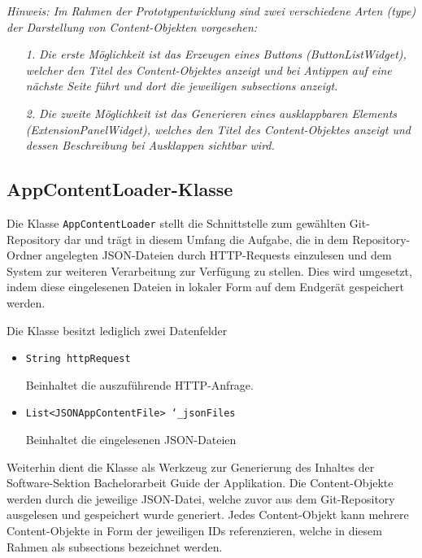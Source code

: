 \documentclass[bibliography=totoc,listof=totoc,BCOR=5mm,DIV=12,oneside]{scrbook}
\begin{document}
{\par \bigskip \textit{Hinweis: Im Rahmen der Prototypentwicklung sind zwei verschiedene Arten (type) der Darstellung von Content-Objekten vorgesehen:}
\begin{itemize}
\item[\textit{1.}] \textit{Die erste Möglichkeit ist das Erzeugen eines Buttons (\grqq ButtonListWidget\grqq), welcher den Titel des Content-Objektes anzeigt und bei Antippen auf eine nächste Seite führt und dort die jeweiligen subsections anzeigt.}
\item[\textit{2.}] \textit{Die zweite Möglichkeit ist das Generieren eines ausklappbaren Elements (\grqq ExtensionPanelWidget\grqq), welches den Titel des Content-Objektes anzeigt und dessen Beschreibung bei Ausklappen sichtbar wird.}
\end{itemize}

\newpage
\subsection{AppContentLoader-Klasse}
\par Die Klasse \texttt{AppContentLoader} stellt die Schnittstelle zum gewählten Git-Repository dar und trägt in diesem Umfang die Aufgabe, die in dem Repository-Ordner angelegten JSON-Dateien durch HTTP-Requests  einzulesen und dem System zur weiteren Verarbeitung zur Verfügung zu stellen. Dies wird umgesetzt, indem diese eingelesenen Dateien in lokaler Form auf dem Endgerät gespeichert werden.
\par Die Klasse besitzt lediglich zwei Datenfelder 
\begin{itemize}
\item \texttt{String httpRequest}
\par Beinhaltet die auszuführende HTTP-Anfrage.
\item \texttt{List<JSONAppContentFile> \char`_jsonFiles}
\par Beinhaltet die eingelesenen JSON-Dateien
\end{itemize}

Weiterhin dient die Klasse als Werkzeug zur Generierung des Inhaltes der Software-Sektion \grqq Bachelorarbeit Guide\grqq{} der Applikation. Die Content-Objekte werden durch die jeweilige JSON-Datei, welche zuvor aus dem Git-Repository ausgelesen und gespeichert wurde generiert. Jedes Content-Objekt kann mehrere Content-Objekte in Form der jeweiligen IDs referenzieren, welche in diesem Rahmen als subsections bezeichnet werden.

}
\end{document}
